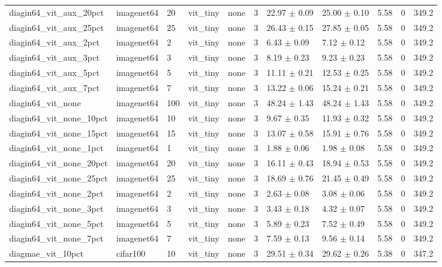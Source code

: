 \begin{tabular}{lllllllllll}
diagin64_vit_aux_20pct & imagenet64 & 20 & vit_tiny & none & 3 & 22.97 $\pm$ 0.09 & 25.00 $\pm$ 0.10 & 5.58 & 0 & 349.2 \\
diagin64_vit_aux_25pct & imagenet64 & 25 & vit_tiny & none & 3 & 26.43 $\pm$ 0.15 & 27.85 $\pm$ 0.05 & 5.58 & 0 & 349.2 \\
diagin64_vit_aux_2pct & imagenet64 & 2 & vit_tiny & none & 3 & 6.43 $\pm$ 0.09 & 7.12 $\pm$ 0.12 & 5.58 & 0 & 349.2 \\
diagin64_vit_aux_3pct & imagenet64 & 3 & vit_tiny & none & 3 & 8.19 $\pm$ 0.23 & 9.23 $\pm$ 0.23 & 5.58 & 0 & 349.2 \\
diagin64_vit_aux_5pct & imagenet64 & 5 & vit_tiny & none & 3 & 11.11 $\pm$ 0.21 & 12.53 $\pm$ 0.25 & 5.58 & 0 & 349.2 \\
diagin64_vit_aux_7pct & imagenet64 & 7 & vit_tiny & none & 3 & 13.22 $\pm$ 0.06 & 15.24 $\pm$ 0.21 & 5.58 & 0 & 349.2 \\
diagin64_vit_none & imagenet64 & 100 & vit_tiny & none & 3 & 48.24 $\pm$ 1.43 & 48.24 $\pm$ 1.43 & 5.58 & 0 & 349.2 \\
diagin64_vit_none_10pct & imagenet64 & 10 & vit_tiny & none & 3 & 9.67 $\pm$ 0.35 & 11.93 $\pm$ 0.32 & 5.58 & 0 & 349.2 \\
diagin64_vit_none_15pct & imagenet64 & 15 & vit_tiny & none & 3 & 13.07 $\pm$ 0.58 & 15.91 $\pm$ 0.76 & 5.58 & 0 & 349.2 \\
diagin64_vit_none_1pct & imagenet64 & 1 & vit_tiny & none & 3 & 1.88 $\pm$ 0.06 & 1.98 $\pm$ 0.08 & 5.58 & 0 & 349.2 \\
diagin64_vit_none_20pct & imagenet64 & 20 & vit_tiny & none & 3 & 16.11 $\pm$ 0.43 & 18.94 $\pm$ 0.53 & 5.58 & 0 & 349.2 \\
diagin64_vit_none_25pct & imagenet64 & 25 & vit_tiny & none & 3 & 18.69 $\pm$ 0.76 & 21.45 $\pm$ 0.49 & 5.58 & 0 & 349.2 \\
diagin64_vit_none_2pct & imagenet64 & 2 & vit_tiny & none & 3 & 2.63 $\pm$ 0.08 & 3.08 $\pm$ 0.06 & 5.58 & 0 & 349.2 \\
diagin64_vit_none_3pct & imagenet64 & 3 & vit_tiny & none & 3 & 3.43 $\pm$ 0.18 & 4.32 $\pm$ 0.07 & 5.58 & 0 & 349.2 \\
diagin64_vit_none_5pct & imagenet64 & 5 & vit_tiny & none & 3 & 5.89 $\pm$ 0.23 & 7.52 $\pm$ 0.49 & 5.58 & 0 & 349.2 \\
diagin64_vit_none_7pct & imagenet64 & 7 & vit_tiny & none & 3 & 7.59 $\pm$ 0.13 & 9.56 $\pm$ 0.14 & 5.58 & 0 & 349.2 \\
diagmae_vit_10pct & cifar100 & 10 & vit_tiny & none & 3 & 29.51 $\pm$ 0.34 & 29.62 $\pm$ 0.26 & 5.38 & 0 & 347.2 \\

\end{tabular}
